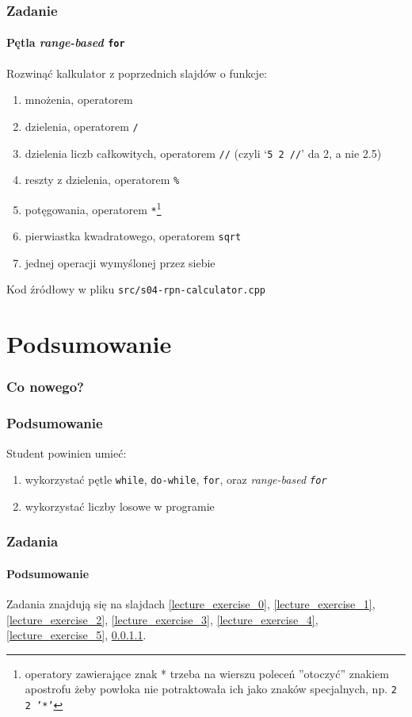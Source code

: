\documentclass[aspectratio=169]{beamer}
\begin{document}
\begin{frame}
    \frametitle{Zadanie}
    \framesubtitle{Pętla \emph{range-based} {\tt for}}
    \label{lecture_exercise_6}

    Rozwinąć kalkulator z poprzednich slajdów o funkcje:

    {\footnotesize
    \begin{enumerate}
        \item mnożenia, operatorem {\tt *}
        \item dzielenia, operatorem {\tt /}
        \item dzielenia liczb całkowitych, operatorem {\tt //} (czyli `{\tt 5 2
            //}' da 2, a nie 2.5)
        \item reszty z dzielenia, operatorem {\tt \%}
        \item potęgowania, operatorem {\tt **}\footnote{operatory zawierające
            znak * trzeba na wierszu poleceń ''otoczyć'' znakiem apostrofu żeby
            powłoka nie potraktowała ich jako znaków specjalnych, np. {\tt 2 2
            '*'}}
        \item pierwiastka kwadratowego, operatorem {\tt sqrt}
        \item jednej operacji wymyślonej przez siebie
    \end{enumerate}}

    Kod źródłowy w pliku {\tt src/s04-rpn-calculator.cpp}
\end{frame}

\section{Podsumowanie}

\begin{frame}
    \frametitle{Co nowego?}
    \frametitle{Podsumowanie}

    Student powinien umieć:

    \begin{enumerate}
        \item wykorzystać pętle {\tt while}, {\tt do-while}, {\tt for}, oraz
            \emph{range-based {\tt for}}
        \item wykorzystać liczby losowe w programie
    \end{enumerate}
\end{frame}

\begin{frame}
    \frametitle{Zadania}
    \framesubtitle{Podsumowanie}

    Zadania znajdują się na slajdach
    \ref{lecture_exercise_0},
    \ref{lecture_exercise_1},
    \ref{lecture_exercise_2},
    \ref{lecture_exercise_3},
    \ref{lecture_exercise_4},
    \ref{lecture_exercise_5},
    \ref{lecture_exercise_6}.
\end{frame}
\end{document}

